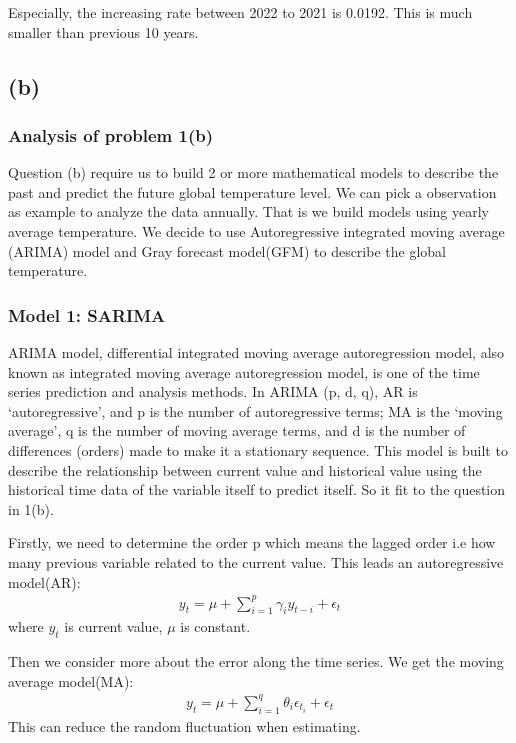 \documentclass{apmcmthesis}
\begin{document}
Especially, the increasing rate between 2022 to 2021 is 0.0192.
This is much smaller than previous 10 years.


\subsection{(b)}
\subsubsection{Analysis of problem 1(b)}
Question (b) require us to build 2 or more mathematical models to describe the past and predict the future global temperature level.
We can pick a observation as example to analyze the data annually. 
That is we build models using yearly average temperature. 
We decide to use Autoregressive integrated moving average (ARIMA) model and Gray forecast model(GFM) to describe the global temperature.

\subsubsection{Model 1: SARIMA}

ARIMA model, differential integrated moving average autoregression model, also known as integrated moving average autoregression model, 
is one of the time series prediction and analysis methods.
In ARIMA (p, d, q), AR is `autoregressive', and p is the number of autoregressive terms; 
MA is the `moving average', q is the number of moving average terms, and d is the number of differences (orders) made to make it a stationary sequence.
This model is built to describe the relationship between current value and historical value using the historical time data of the variable itself to predict itself.
So it fit to the question in 1(b).

Firstly, we need to determine the order p which means the lagged order i.e how many previous variable related to the current value.
This leads an autoregressive model(AR):
\begin{align*}
  y_t = \mu + \sum^p_{i=1} \gamma_i y_{t-i} + \epsilon_t
\end{align*}
where $y_t$ is current value, $\mu$ is constant.

Then we consider more about the error along the time series. 
We get the moving average model(MA):
\begin{align*}
  y_t = \mu + \sum^q_{i=1} \theta_i \epsilon_{t_i} + \epsilon_t
\end{align*}
This can reduce the random fluctuation when estimating. 
\end{document}
